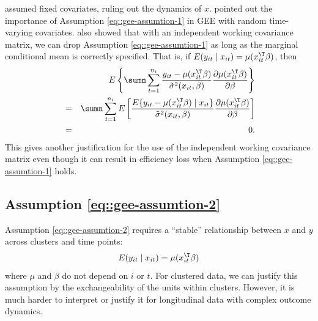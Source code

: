 \citet{liang1986longitudinal} assumed fixed covariates, ruling out the dynamics of $x$.
\citet{sullivan1994cautionary} pointed out the importance of Assumption \eqref{eq::gee-assumtion-1} in GEE with random time-varying covariates. \citet{sullivan1994cautionary}  also showed that with an independent working covariance matrix, we can drop Assumption \eqref{eq::gee-assumtion-1} as long as the marginal conditional mean is correctly specified. That is, if $E(y_{it}\mid x_{it}) = \mu(x_{it}^{\T}\beta)$, then 
\begin{eqnarray*}
&&E\left\{ \sumn\sum_{t=1}^{n_{i}}\frac{y_{it}-\mu(x_{it}^{\T}\beta)}{\tilde{\sigma}^{2}(x_{it}, \beta)}\frac{\partial\mu(x_{it}^{\T}\beta)}{\partial\beta} \right\}  \\
 &=&\sumn\sum_{t=1}^{n_{i}}  E\left[ \frac{ E\{ y_{it}-\mu(x_{it}^{\T}\beta) \mid x_{it} \} }{\tilde{\sigma}^{2}(x_{it}, \beta)}\frac{\partial\mu(x_{it}^{\T}\beta)}{\partial\beta} \right] \\
 &=& 0.
\end{eqnarray*}
This gives another justification for the use of the independent working covariance matrix even though it can result in efficiency loss when Assumption \eqref{eq::gee-assumtion-1} holds. 


\subsection{Assumption \eqref{eq::gee-assumtion-2}} 


Assumption \eqref{eq::gee-assumtion-2} requires a ``stable'' relationship between $x$ and $y$ across clusters and time points:
$$
E(y_{it} \mid x_{it}) = \mu(x_{it}^{\T} \beta)
$$ 
where $\mu$ and $\beta$ do not depend on $i$ or $t$. 
For clustered data, we can justify this assumption by the exchangeability of the units within clusters. However, it is much harder to interpret or justify it for longitudinal data with complex outcome dynamics. 

